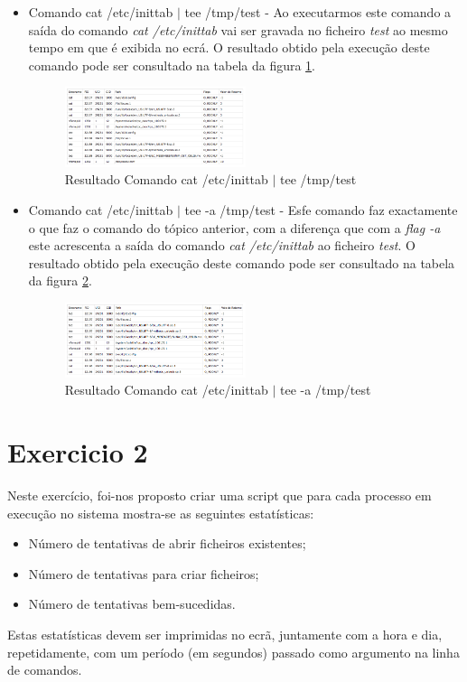 \documentclass[conference,compsoc]{IEEEtran}
\begin{document}
\begin{itemize}
\item Comando cat /etc/inittab $|$ tee /tmp/test - Ao executarmos este comando a saída do comando \textit{cat /etc/inittab} vai ser gravada no ficheiro \textit{test} ao mesmo tempo em que é exibida no ecrá. O resultado obtido pela execução deste comando pode ser consultado na tabela da figura \ref{fig:cat3}.
\begin{figure}[h!]
\begin{center}
\includegraphics[width=0.5\textwidth]{Tables/cat3.png}
\caption{Resultado Comando cat /etc/inittab $|$ tee /tmp/test}
\label{fig:cat3}
\end{center}
\end{figure}

\item Comando cat /etc/inittab $|$ tee -a /tmp/test - Esfe comando faz exactamente o que faz o comando do tópico anterior, com a diferença que com a \textit{flag -a} este acrescenta a saída do comando \textit{cat /etc/inittab} ao ficheiro \textit{test}. O resultado obtido pela execução deste comando pode ser consultado na tabela da figura \ref{fig:cat4}.
\begin{figure}[h!]
\begin{center}
\includegraphics[width=0.5\textwidth]{Tables/cat4.png}
\caption{Resultado Comando cat /etc/inittab $|$ tee -a /tmp/test}
\label{fig:cat4}
\end{center}
\end{figure}

\end{itemize}

\section{Exercicio 2}
Neste exercício, foi-nos proposto criar uma script que para cada processo em execução no sistema mostra-se as seguintes estatísticas:
\begin{itemize}
\item Número de tentativas de abrir ficheiros existentes;
\item Número de tentativas para criar ficheiros;
\item Número de tentativas bem-sucedidas.
\end{itemize}
Estas estatísticas devem ser imprimidas no ecrã, juntamente com a hora e dia, repetidamente, com um período (em segundos) passado como argumento na linha de comandos.
\end{document}
